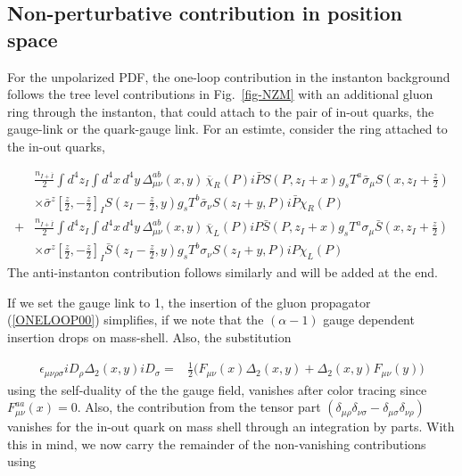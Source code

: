 \documentclass[11pt,aps,amsmath,amssymb,nofootinbib,notitlepage,longbibliography]{revtex4-1}
\begin{document}
\subsection{Non-perturbative contribution in position space}



For the unpolarized PDF, the one-loop contribution in the instanton background
follows the tree level contributions in Fig.~\ref{fig-NZM} with an additional  gluon ring through the instanton,
that could attach to the pair of in-out quarks, the gauge-link or the quark-gauge link.  For an estimte, consider
the ring attached to the in-out quarks,





\begin{align}\label{ONELOOP1}
&\frac{n_{I+\bar I}}{2}\int d^4z_{I}\int d^4x \,d^4y\,\Delta^{ab}_{\mu\nu}(x,y)\,
\overline\chi_R(P)i\bar P{S}(P,z_I+x)g_sT^a\bar\sigma_\mu S(x, z_I+\frac z2)\nonumber\\
&\times \bar \sigma^z[\frac{z}{2},-\frac{z}{2}]_IS(z_I-\frac z2, y)g_sT^b\bar\sigma_\nu {S}(z_{I}+y,P)i\bar P\chi_R(P)\nonumber \\
+&\frac{n_{I+\bar I}}{2}\int d^4z_{I} \int d^4x \,d^4y\,\Delta^{ab}_{\mu\nu}(x,y)\,
\overline\chi_L(P)i P{\bar S}(P,z_{I}+x)g_sT^a\sigma_\mu \bar S(x, z_{ I}+\frac z2)\nonumber\\
&\times\sigma^z[\frac{z}{2},-\frac{z}{2}]_{ I}\bar S(z_{ I}-\frac z2, y)g_sT^b\sigma_\nu {S}(z_{ I}+y,P)iP\chi_L(P)
\end{align}
The anti-instanton contribution follows similarly and will be added at the end.

If we set the gauge link to 1,
the insertion of the gluon propagator (\ref{ONELOOP00}) simplifies, if we note that the
$(\alpha-1)$ gauge dependent insertion drops on mass-shell.  Also, the substitution

\begin{align}
\label{ONELOOPX2}
 \epsilon_{\mu\nu\rho\sigma}iD_\rho\Delta_2(x,y)iD_\sigma=&\frac 12\bigg(F_{\mu\nu}(x)\Delta_2(x,y)+\Delta_2(x,y)F_{\mu\nu}(y)\bigg)
\end{align}
using the self-duality of the the gauge field, vanishes after color tracing since $F_{\mu\nu}^{aa}(x)=0$.
Also, the contribution from the tensor part $(\delta_{\mu\rho}\delta_{\nu\sigma}-\delta_{\mu\sigma}\delta_{\nu\rho})$ vanishes for the
in-out quark on mass shell through an integration by parts.
With this in mind,  we now carry the remainder of the non-vanishing contributions using
\end{document}
